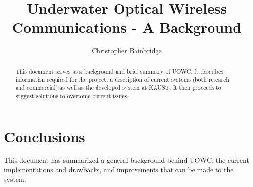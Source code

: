 \documentclass{article}
\author{Christopher Bainbridge}
\title{Underwater Optical Wireless Communications - A Background}
\begin{document}
\maketitle

\begin{abstract}
This document serves as a background and brief summary of \ac{UOWC}. It
describes information required for the project, a description of current
systems (both research and commercial) as well as the developed system at
\ac{KAUST}. It then proceeds to suggest solutions to overcome current
issues.
\end{abstract}









\section{Conclusions}
This document has summarized a general background behind \ac{UOWC}, the current
implementations and drawbacks, and improvements that can be made to the system.





\end{document}
